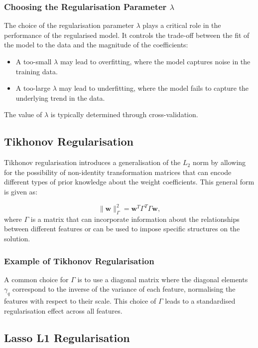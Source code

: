 \subsubsection*{Choosing the Regularisation Parameter \( \lambda \)}
The choice of the regularisation parameter \( \lambda \) plays a critical role in the performance of the regularised model. It controls the trade-off between the fit of the model to the data and the magnitude of the coefficients:

\begin{itemize}
    \item A too-small \( \lambda \) may lead to overfitting, where the model captures noise in the training data.
    \item A too-large \( \lambda \) may lead to underfitting, where the model fails to capture the underlying trend in the data.
\end{itemize}

The value of \( \lambda \) is typically determined through cross-validation.

\subsection{Tikhonov Regularisation}

Tikhonov regularisation introduces a generalisation of the \( L_2 \) norm by allowing for the possibility of non-identity transformation matrices that can encode different types of prior knowledge about the weight coefficients. This general form is given as:

\begin{equation}
\|\mathbf{w}\|_{\Gamma}^2 = \mathbf{w}^T\Gamma^T\Gamma\mathbf{w},
\end{equation}
where \( \Gamma \) is a matrix that can incorporate information about the relationships between different features or can be used to impose specific structures on the solution.

\subsubsection*{Example of Tikhonov Regularisation}
A common choice for \( \Gamma \) is to use a diagonal matrix where the diagonal elements \( \gamma_q \) correspond to the inverse of the variance of each feature, normalising the features with respect to their scale. This choice of \( \Gamma \) leads to a standardised regularisation effect across all features.

\subsection{Lasso L1 Regularisation}

